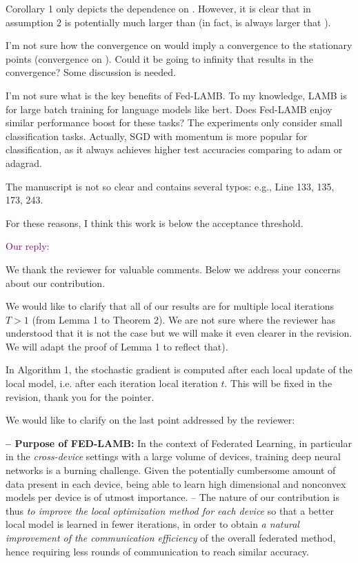 \documentclass{article}
\begin{document}
Corollary 1 only depicts the dependence on . However, it is clear that  in assumption 2 is potentially much larger than  (in fact,  is always larger that ).

I'm not sure how the convergence on 
 would imply a convergence to the stationary points (convergence on ). Could it be 
 going to infinity that results in the convergence? Some discussion is needed.

I'm not sure what is the key benefits of Fed-LAMB. To my knowledge, LAMB is for large batch training for language models like bert. Does Fed-LAMB enjoy similar performance boost for these tasks? The experiments only consider small classification tasks. Actually, SGD with momentum is more popular for classification, as it always achieves higher test accuracies comparing to adam or adagrad.

The manuscript is not so clear and contains several typos: e.g., Line 133, 135, 173, 243.

For these reasons, I think this work is below the acceptance threshold.




\textcolor{purple}{Our reply:}

We thank the reviewer for valuable comments. Below we address your concerns about our contribution.

We would like to clarify that all of our results are for multiple local iterations $T > 1$ (from Lemma 1 to Theorem 2). We are not sure where the reviewer has understood that it is not the case but we will make it even clearer in the revision. We will adapt the proof of Lemma 1 to reflect that).

In Algorithm 1, the stochastic gradient is computed after each local update of the local model, i.e. after each iteration local iteration $t$. This will be fixed in the revision, thank you for the pointer.


We would like to clarify on the last point addressed by the reviewer:

\textbf{-- Purpose of FED-LAMB:} 
In the context of Federated Learning, in particular in the \emph{cross-device} settings with a large volume of devices, training deep neural networks is a burning challenge.
Given the potentially cumbersome amount of data present in each device, being able to learn high dimensional and nonconvex models per device is of utmost importance.
-- The nature of our contribution is thus \emph{to improve the local optimization method for each device} so that a better local model is learned in fewer iterations, in order to obtain \emph{a natural improvement of the communication efficiency} of the overall federated method, hence requiring less rounds of communication to reach similar accuracy.
\end{document}
